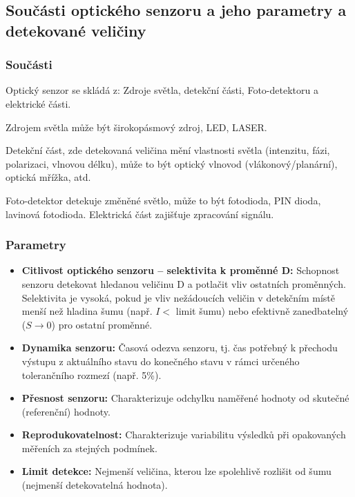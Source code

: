 \documentclass[a4paper, 12pt]{article}
\begin{document}
        \subsection{Součásti optického senzoru a jeho parametry a detekované veličiny}
            \subsubsection{Součásti}
                Optický senzor se skládá z: Zdroje světla, detekční části, Foto-detektoru a elektrické části.
                
                Zdrojem světla může být širokopásmový zdroj, LED, LASER. 
                
                Detekční část, zde detekovaná veličina mění vlastnosti světla
                (intenzitu, fázi, polarizaci, vlnovou délku), může to být optický vlnovod
                (vlákonový/planární), optická mřížka, atd. 
                
                Foto-detektor detekuje změněné světlo, může to být fotodioda, PIN dioda, lavinová fotodioda.
                Elektrická část zajišťuje zpracování signálu. 
            \subsubsection{Parametry}
                \begin{itemize}
                    \item \textbf{Citlivost optického senzoru -- selektivita k proměnné D:}
                        Schopnost senzoru detekovat hledanou veličinu D a potlačit vliv ostatních proměnných.
                        Selektivita je vysoká, pokud je vliv nežádoucích veličin v detekčním místě menší než hladina šumu
                        (např. $I<$ limit šumu) nebo efektivně zanedbatelný ($S\rightarrow 0$) pro ostatní proměnné.
                    \item \textbf{Dynamika senzoru:}
                        Časová odezva senzoru, tj. čas potřebný k přechodu výstupu z aktuálního stavu do konečného stavu
                        v rámci určeného tolerančního rozmezí (např. 5\%).
                    \item \textbf{Přesnost senzoru:}
                        Charakterizuje odchylku naměřené hodnoty od skutečné (referenční) hodnoty.
                    \item \textbf{Reprodukovatelnost:}
                        Charakterizuje variabilitu výsledků při opakovaných měřeních za stejných podmínek.
                    \item \textbf{Limit detekce:}
                        Nejmenší veličina, kterou lze spolehlivě rozlišit od šumu (nejmenší detekovatelná hodnota).
                \end{itemize}
            
\end{document}
